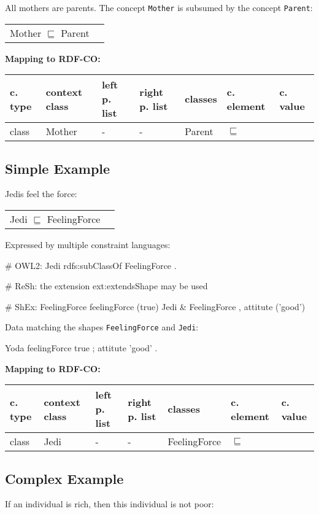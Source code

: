 \documentclass{llncs}
\newcommand{\ms}[1]{\texttt{#1}}
\newenvironment{gcotable}{
  \scriptsize
  \sffamily
  \vspace{0cm}
	\begin{center}
	\textbf{\vspace{0.4cm}Mapping to RDF-CO:} \\
  \begin{tabular}{l|l|l|l|l|l|l}
	\hline
  \textbf{c. type} & \textbf{context class} & \textbf{left p. list} & \textbf{right p. list} & \textbf{classes} & \textbf{c. element} & \textbf{c. value} \\
  \hline

}{
  \hline
  \end{tabular}
	\end{center}
}
\newenvironment{DL}{
  \vspace{0cm}
	\begin{center}
  \begin{tabular}{r l}

}{
  \end{tabular}
	\end{center}
}
\begin{document}
All mothers are parents.
The concept \ms{Mother} is subsumed by the concept \ms{Parent}:

\begin{DL}
Mother $\sqsubseteq$ Parent \\
\end{DL}

\begin{gcotable}
class & Mother & - & - & Parent & $\sqsubseteq$ \\
\end{gcotable}

\subsection{Simple Example}

Jedis feel the force:

\begin{DL}
Jedi $\sqsubseteq$ FeelingForce
\end{DL}

Expressed by multiple constraint languages:

\begin{ex}
# OWL2:
Jedi rdfs:subClassOf FeelingForce .
\end{ex}

\begin{ex}
# ReSh:
the extension ext:extendsShape may be used
\end{ex}

\begin{ex}
# ShEx:
FeelingForce {
    feelingForce (true) }
Jedi {
    & FeelingForce ,
    attitute ('good') }
\end{ex}

Data matching the shapes \ms{FeelingForce} and \ms{Jedi}:

\begin{ex}
Yoda 
    feelingForce true ;
    attitute 'good' .
\end{ex}

\begin{gcotable}
class & Jedi & - & - & FeelingForce & $\sqsubseteq$ \\
\end{gcotable}

\subsection{Complex Example}

If an individual is rich, then this individual is not poor:
\end{document}
